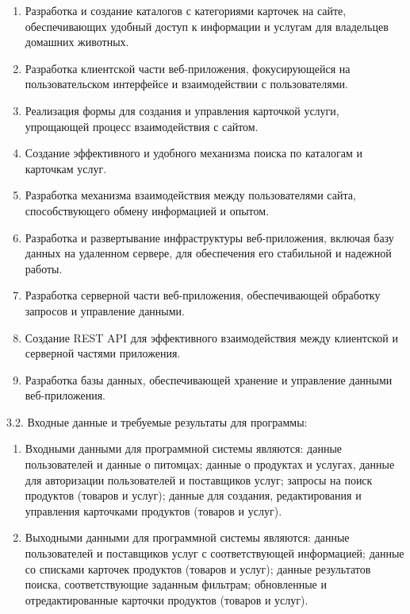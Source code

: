 \begin{enumerate}
\item Разработка и создание каталогов с категориями карточек на сайте, обеспечивающих удобный доступ к информации и услугам для владельцев домашних животных.
\item Разработка клиентской части веб-приложения, фокусирующейся на пользовательском интерфейсе и взаимодействии с пользователями.
\item Реализация формы для создания и управления карточкой услуги, упрощающей процесс взаимодействия с сайтом.
\item Создание эффективного и удобного механизма поиска по каталогам и карточкам услуг.
\item Разработка механизма взаимодействия между пользователями сайта, способствующего обмену информацией и опытом.
\item Разработка и развертывание инфраструктуры веб-приложения, включая базу данных на удаленном сервере, для обеспечения его стабильной и надежной работы.
\item Разработка серверной части веб-приложения, обеспечивающей обработку запросов и управление данными.
\item Создание REST API для эффективного взаимодействия между клиентской и серверной частями приложения.
\item Разработка базы данных, обеспечивающей хранение и управление данными веб-приложения.
\end{enumerate}

{\parindent0pt
  3.2. Входные данные и требуемые результаты для программы:}

\begin{enumerate}
\item Входными данными для программной системы являются: данные пользователей и данные о питомцах;
данные о продуктах и услугах, данные для авторизации пользователей и поставщиков услуг;
запросы на поиск продуктов (товаров и услуг);
данные для создания, редактирования и управления карточками продуктов (товаров и услуг).
\item Выходными данными для программной системы являются: данные пользователей и поставщиков услуг с соответствующей информацией;
данные со списками карточек продуктов (товаров и услуг);
данные результатов поиска, соответствующие заданным фильтрам;
обновленные и отредактированные карточки продуктов (товаров и услуг).
\end{enumerate}

